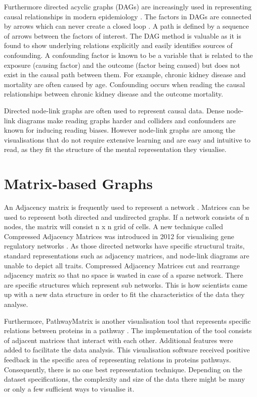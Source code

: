 \documentclass{l4proj}
\begin{document}
Furthermore directed acyclic graphs (DAGs) are increasingly used in representing causal relationships in modern epidemiology \cite{suttorp2015graphical}. The factors in DAGs are connected by arrows which can never create a closed loop \cite{greenland1999causal}. A path is defined by a sequence of arrows between the factors of interest. The DAG method is valuable as it is found to show underlying relations explicitly and easily identifies sources of confounding. A confounding factor is known to be a variable that is related to  the exposure (causing factor) and the outcome (factor being caused) but does not exist in the causal path between them. For example, chronic kidney disease and mortality are often caused by age. Confounding occurs when reading the causal relationships between chronic kidney disease and the outcome mortality. 

Directed node-link graphs are often used to represent causal data. Dense node-link diagrams make reading graphs harder and colliders and confounders are known for inducing reading biases. However node-link graphs are among the visualisations that do not require extensive learning and are easy and intuitive to read, as they fit the structure of the mental representation they visualise\cite{netzel2014comparative}.

\section{Matrix-based Graphs}

An Adjacency matrix is frequently used to represent a network \cite{longabaugh2012combing}. Matrices can be used to represent both directed and undirected graphs. If a network consists of n nodes, the matrix will consist n x n grid of cells. A new technique called Compressed Adjacency Matrices was introduced in 2012 for visualising gene regulatory networks \cite{dinkla2012compressed}. As those directed networks have specific structural traits, standard representations such as adjacency matrices, and node-link diagrams are unable to depict all traits. Compressed Adjacency Matrices cut and rearrange adjacency matrix so that no space is wasted in case of a sparse network. There are specific structures which represent sub networks. This is how scientists came up with a new data structure in order to fit the characteristics of the data they analyse.

Furthermore, PathwayMatrix is another visualisation tool that represents specific relations between proteins in a pathway \cite{dang2015pathwaymatrix}. The implementation of the tool consists of adjacent matrices that interact with each other. Additional features were added to facilitate the data analysis. This visualisation software received positive feedback in the specific area of representing relations in proteins pathways. Consequently, there is no one best representation technique. Depending on the dataset specifications, the complexity and size of the data there might be many or only a few sufficient ways to visualise it.       
\end{document}
